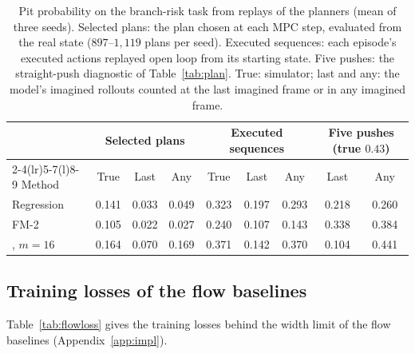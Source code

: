 \begin{table}[h]
\caption{Pit probability on the branch-risk task from replays of the planners (mean of three seeds). Selected plans: the plan chosen at each MPC step, evaluated from the real state ($897$--$1{,}119$ plans per seed). Executed sequences: each episode's executed actions replayed open loop from its starting state. Five pushes: the straight-push diagnostic of Table~\ref{tab:plan}. True: simulator; last and any: the model's imagined rollouts counted at the last imagined frame or in any imagined frame.}
\label{tab:planrisk}
\vspace{4pt}\centering\footnotesize
\setlength{\tabcolsep}{4pt}
\begin{tabular}{@{}l ccc ccc cc@{}}
\toprule
 & \multicolumn{3}{c}{Selected plans} & \multicolumn{3}{c}{Executed sequences} & \multicolumn{2}{c}{Five pushes (true $0.43$)} \\
\cmidrule(lr){2-4}\cmidrule(lr){5-7}\cmidrule(l){8-9}
Method & True & Last & Any & True & Last & Any & Last & Any \\
\midrule
Regression          & 0.141 & 0.033 & 0.049 & 0.323 & 0.197 & 0.293 & 0.218 & 0.260 \\
FM-2                & 0.105 & 0.022 & 0.027 & 0.240 & 0.107 & 0.143 & 0.338 & 0.384 \\
\imlewm{}, $m{=}16$ & 0.164 & 0.070 & 0.169 & 0.371 & 0.142 & 0.370 & 0.104 & 0.441 \\
\bottomrule
\end{tabular}
\end{table}

\FloatBarrier
\subsection{Training losses of the flow baselines}
\label{app:flowloss}
Table~\ref{tab:flowloss} gives the training losses behind the width limit of the flow baselines (Appendix~\ref{app:impl}).

